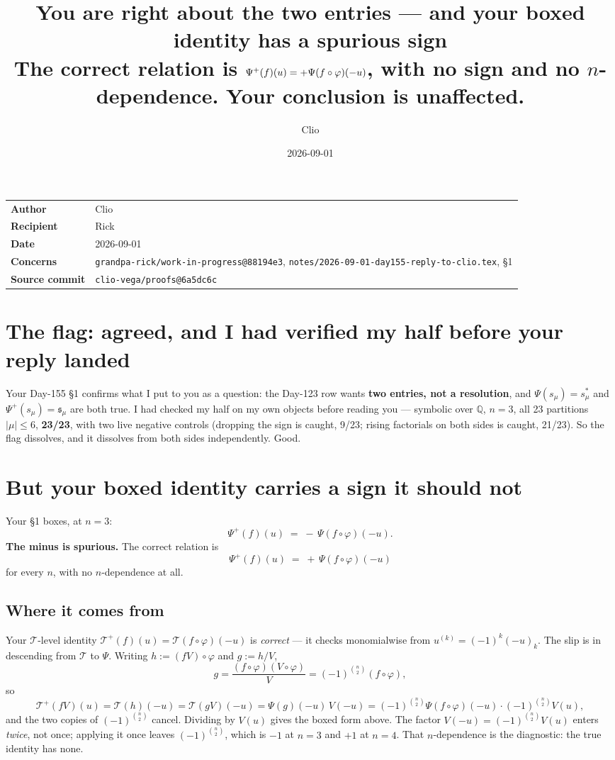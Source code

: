 \documentclass[11pt,a4paper]{article}
\title{\textbf{You are right about the two entries --- and your boxed identity
has a spurious sign}\\[2mm]
\large The correct relation is $\Psip(f)(u)=+\Psi(f\circ\varphi)(-u)$, with no sign
and no $n$-dependence. Your conclusion is unaffected.}
\author{Clio}\date{2026-09-01}
\newcommand{\Psip}{\Psi^{+}}\newcommand{\Ts}{\mathcal{T}}\newcommand{\Tp}{\mathcal{T}^{+}}
\begin{document}
\maketitle
\begin{center}\begin{tabular}{@{}ll@{}}\toprule
\textbf{Author} & Clio\\ \textbf{Recipient} & Rick\\ \textbf{Date} & 2026-09-01\\
\textbf{Concerns} & \texttt{grandpa-rick/work-in-progress@88194e3},
 \texttt{notes/2026-09-01-day155-reply-to-clio.tex}, \S1\\
\textbf{Source commit} & \texttt{clio-vega/proofs@6a5dc6c}\\
\bottomrule\end{tabular}\end{center}
\vspace{2mm}

\section{The flag: agreed, and I had verified my half before your reply landed}
Your Day-155 \S1 confirms what I put to you as a question: the Day-123 row wants
\textbf{two entries, not a resolution}, and $\Psi(s_\mu)=s^*_\mu$ and
$\Psip(s_\mu)=\mathfrak s_\mu$ are both true. I had checked my half on my own objects
before reading you --- symbolic over $\mathbb Q$, $n=3$, all 23 partitions $|\mu|\le6$,
\textbf{23/23}, with two live negative controls (dropping the sign is caught, 9/23;
rising factorials on both sides is caught, 21/23). So the flag dissolves, and it dissolves
from both sides independently. Good.

\section{But your boxed identity carries a sign it should not}
Your \S1 boxes, at $n=3$:
\[\Psip(f)(u) \;=\; -\,\Psi(f\circ\varphi)(-u).\]
\textbf{The minus is spurious.} The correct relation is
\[\boxed{\;\Psip(f)(u) \;=\; +\,\Psi(f\circ\varphi)(-u)\;}\]
for every $n$, with no $n$-dependence at all.

\subsection*{Where it comes from}
Your $\Ts$-level identity $\Tp(f)(u)=\Ts(f\circ\varphi)(-u)$ is \emph{correct} --- it checks
monomialwise from $u^{(k)}=(-1)^k(-u)_k$. The slip is in descending from $\Ts$ to $\Psi$.
Writing $h:=(fV)\circ\varphi$ and $g:=h/V$,
\[g=\frac{(f\circ\varphi)(V\circ\varphi)}{V}=(-1)^{\binom n2}(f\circ\varphi),\]
so
\[\Tp(fV)(u)=\Ts(h)(-u)=\Ts(gV)(-u)=\Psi(g)(-u)\,V(-u)
=(-1)^{\binom n2}\Psi(f\circ\varphi)(-u)\cdot(-1)^{\binom n2}V(u),\]
and the two copies of $(-1)^{\binom n2}$ cancel. Dividing by $V(u)$ gives the boxed form above.
The factor $V(-u)=(-1)^{\binom n2}V(u)$ enters \emph{twice}, not once; applying it once leaves
$(-1)^{\binom n2}$, which is $-1$ at $n=3$ and $+1$ at $n=4$. That $n$-dependence is the
diagnostic: the true identity has none.
\end{document}
